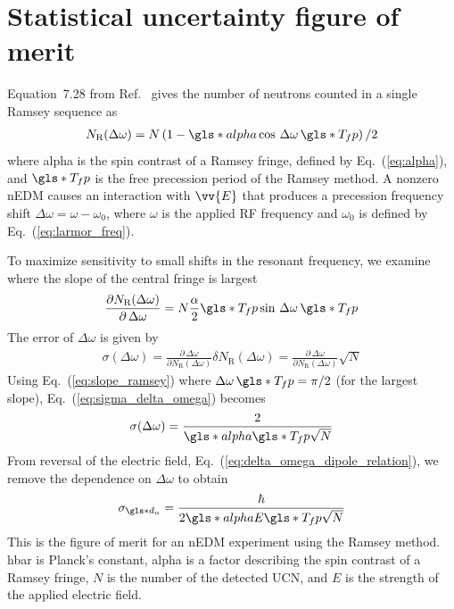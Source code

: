 
\section{Statistical uncertainty figure of merit}\label{sec:figure_of_merit}


Equation~7.28 from Ref.~\cite{golubUCN} gives the number of neutrons counted in a single Ramsey sequence as
%
\begin{gather}
    N_\text{R}(\Delta \omega) = N \left( 1 - \gls*{alpha} \cos \,\Delta \omega \, \gls*{T_fp} \right)/2
\end{gather}
%
where \gls*{alpha} is the spin contrast of a Ramsey fringe, defined by Eq.~(\ref{eq:alpha}), and $\gls*{T_fp}$ is the free precession period of the Ramsey method. A nonzero nEDM causes an interaction with $\vv{E}$ that produces a precession frequency shift $\Delta\omega=\omega-\omega_0$, where $\omega$ is the applied RF frequency and $\omega_0$ is defined by Eq.~(\ref{eq:larmor_freq}). 

To maximize sensitivity to small shifts in the resonant frequency, we examine where the slope of the central fringe is largest
%
\begin{gather}
    \frac{\partial N_\text{R}(\Delta \omega)}{\partial \, \Delta \omega} = N \frac{\alpha}{2} \gls*{T_fp} \sin \, \Delta \omega \, \gls*{T_fp} \label{eq:slope_ramsey}
\end{gather}
%
The error of $\Delta \omega$ is given by
%
\begin{gather}
    \sigma(\Delta \omega) = \frac{\partial \, \Delta \omega}{\partial N_\text{R}(\Delta \omega)}\delta N_\text{R}(\Delta \omega) = \frac{\partial \, \Delta \omega}{\partial N_\text{R}(\Delta \omega)} \sqrt{N}
    \label{eq:sigma_delta_omega}
\end{gather}
%
Using Eq.~(\ref{eq:slope_ramsey}) where $\Delta \omega \, \gls*{T_fp} = \pi/2$ (for the largest slope), Eq.~(\ref{eq:sigma_delta_omega}) becomes
%
\begin{gather}
    \sigma(\Delta \omega) = \frac{2}{\gls*{alpha} \gls*{T_fp} \sqrt{N}}
\end{gather}
%
From reversal of the electric field, Eq.~(\ref{eq:delta_omega_dipole_relation}), we remove the dependence on $\Delta\omega$ to obtain
%
\begin{gather}
    \sigma_{\gls*{d_n}} = \frac{\hbar}{2\gls*{alpha} E \gls*{T_fp} \sqrt{N}}\label{eq:figure_of_merit}
\end{gather}
%
This is the figure of merit for an nEDM experiment using the Ramsey method. \gls{hbar} is Planck’s constant, \gls{alpha} is a factor describing the spin contrast of a Ramsey fringe, $N$ is the number of the detected UCN, and $E$ is the strength of the applied electric field.


